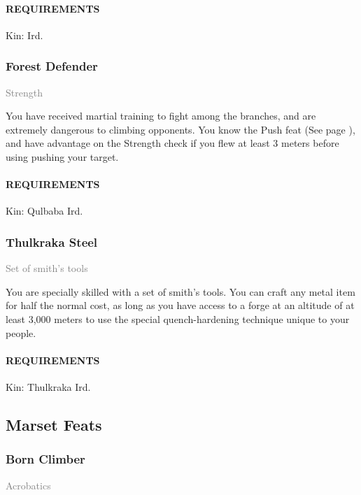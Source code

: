     \paragraph{REQUIREMENTS} Kin: Ird.

    \subsubsection{Forest Defender} \label{feat::forestdefender}
    \small{\textcolor{gray}{Strength}}

    \normalsize
    You have received martial training to fight among the branches, and are extremely dangerous to climbing opponents.
    You know the Push feat (See page \pageref{feat::push}), and have advantage on the Strength check if you flew at least 3 meters before using pushing your target.
    \paragraph{REQUIREMENTS} Kin: Qulbaba Ird.

    \subsubsection{Thulkraka Steel} \label{feat::thulkrakasteel}
    \small{\textcolor{gray}{Set of smith's tools}}

    \normalsize
    You are specially skilled with a set of smith's tools.
    You can craft any metal item for half the normal cost, as long as you have access to a forge at an altitude of at least 3,000 meters to use the special quench-hardening technique unique to your people.
    \paragraph{REQUIREMENTS} Kin: Thulkraka Ird.

\subsection*{Marset Feats}
    \subsubsection{Born Climber} \label{feat::bornclimber}
    \small{\textcolor{gray}{Acrobatics}}


